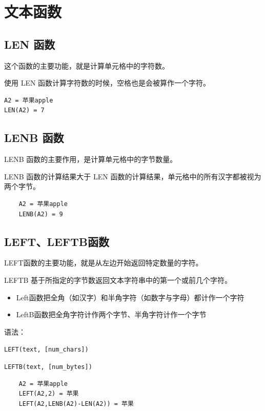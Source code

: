 \section{文本函数}

\subsection{LEN 函数}

这个函数的主要功能，就是计算单元格中的字符数。

使用 LEN 函数计算字符数的时候，空格也是会被算作一个字符。

\begin{lstlisting}
A2 = 苹果apple
LEN(A2) = 7
\end{lstlisting}

\subsection{LENB 函数}

LENB 函数的主要作用，是计算单元格中的字节数量。

LENB 函数的计算结果大于 LEN 函数的计算结果，单元格中的所有汉字都被视为两个字节。

\begin{lstlisting}
    A2 = 苹果apple
    LENB(A2) = 9
\end{lstlisting}
    
\subsection{LEFT、LEFTB函数}

LEFT函数的主要功能，就是从左边开始返回特定数量的字符。

LEFTB 基于所指定的字节数返回文本字符串中的第一个或前几个字符。

\begin{itemize}
    \item Left函数把全角（如汉字）和半角字符（如数字与字母）都计作一个字符
    \item LeftB函数把全角字符计作两个字节、半角字符计作一个字节
  \end{itemize}

  语法：

  \verb|LEFT(text, [num_chars])|
  
  \verb|LEFTB(text, [num_bytes])|

\begin{lstlisting}
    A2 = 苹果apple
    LEFT(A2,2) = 苹果
    LEFT(A2,LENB(A2)-LEN(A2)) = 苹果
\end{lstlisting}

